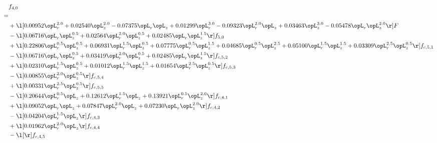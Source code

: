 \begin{alignat}{2} 
\label{eq:f_40_2} 
& f_{4,0} \nonumber \\ 
 = \\ 
& + \l[  0.00952 \opL_r^{2.0} +  0.02540 \opL_z^{2.0}   -0.07375 \opL_r \opL_z +  0.01299 \opL_r^{3.0}   -0.09323 \opL_r^{2.0} \opL_z +  0.03463 \opL_z^{3.0}   -0.05478 \opL_r \opL_z^{2.0}  \r] F \nonumber \\ 
& - \l[  0.06716 \opL_r \opL_z^{0.5} +  0.02564 \opL_r^{2.0} \opL_z^{0.5} +  0.02485 \opL_r \opL_z^{1.5}  \r] f_{5,0} \nonumber \\ 
& + \l[  0.22806 \opL_r^{0.5} \opL_z^{0.5} +  0.06931 \opL_r^{1.5} \opL_z^{0.5} +  0.07775 \opL_r^{0.5} \opL_z^{1.5} +  0.04685 \opL_r^{0.5} \opL_z^{2.5} +  0.05100 \opL_r^{1.5} \opL_z^{1.5} +  0.03309 \opL_r^{2.5} \opL_z^{0.5}  \r] f_{c,5,1} \nonumber \\ 
& - \l[  0.06716 \opL_r \opL_z^{0.5} +  0.03419 \opL_r^{2.0} \opL_z^{0.5} +  0.02485 \opL_r \opL_z^{1.5}  \r] f_{c,5,2} \nonumber \\ 
& + \l[  0.02310 \opL_r^{1.5} \opL_z^{0.5} +  0.01012 \opL_r^{1.5} \opL_z^{1.5} +  0.01654 \opL_r^{2.5} \opL_z^{0.5}  \r] f_{c,5,3} \nonumber \\ 
& - \l[  0.00855 \opL_r^{2.0} \opL_z^{0.5}  \r] f_{c,5,4} \nonumber \\ 
& + \l[  0.00331 \opL_r^{2.5} \opL_z^{0.5}  \r] f_{c,5,5} \nonumber \\ 
& - \l[  0.20644 \opL_r^{0.5} \opL_z +  0.12612 \opL_r^{1.5} \opL_z +  0.13921 \opL_r^{0.5} \opL_z^{2.0}  \r] f_{c,4,1} \nonumber \\ 
& + \l[  0.09052 \opL_r \opL_z +  0.07847 \opL_r^{2.0} \opL_z +  0.07230 \opL_r \opL_z^{2.0}  \r] f_{c,4,2} \nonumber \\ 
& - \l[  0.04204 \opL_r^{1.5} \opL_z  \r] f_{c,4,3} \nonumber \\ 
& + \l[  0.01962 \opL_r^{2.0} \opL_z  \r] f_{c,4,4} \nonumber \\ 
& - \l[  \r] f_{c,4,5} \nonumber \\ 
\end{alignat} 


